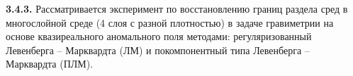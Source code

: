 % 

\newpage
{\bfseries 3.4.3.} Рассматривается эксперимент по восстановлению границ раздела сред в многослойной среде (4 слоя с разной плотностью) в задаче гравиметрии на основе квазиреального аномального поля методами: регуляризованный Левенберга -- Марквардта (ЛМ) и покомпонентный типа Левенберга -- Марквардта (ПЛМ).

